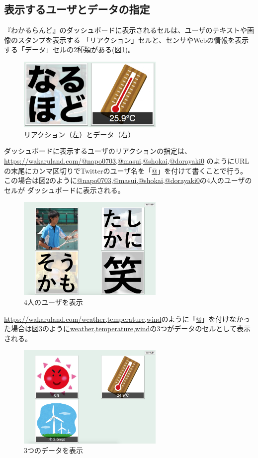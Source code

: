 \subsection{表示するユーザとデータの指定}
『わかるらんど』のダッシュボードに表示されるセルは、ユーザのテキストや画像のスタンプを表示する
「リアクション」セルと、センサやWebの情報を表示する「データ」セルの2種類がある(図\ref{cell})。

\begin{figure}[h]
\centering
\includegraphics[width=7cm]{images/cell.png}
\caption{リアクション（左）とデータ（右）}
\label{cell}
\end{figure}

ダッシュボードに表示するユーザのリアクションの指定は、
\url{https://wakaruland.com/@napo0703,@masui,@shokai,@dorayaki0}
のようにURLの末尾にカンマ区切りでTwitterのユーザ名を「\url{@}」を付けて書くことで行う。
この場合は図\ref{n_m_s_d}のように\url{@napo0703,@masui,@shokai,@dorayaki0}の4人のユーザのセルが
ダッシュボードに表示される。

\begin{figure}[h]
\centering
\includegraphics[width=7cm]{images/n_m_s_d.png}
\caption{4人のユーザを表示}
\label{n_m_s_d}
\end{figure}

\url{https://wakaruland.com/weather,temperature,wind}のように「\url{@}」を付けなかった場合は図\ref{w_t_w}のように\url{weather,temperature,wind}の3つがデータのセルとして表示される。

\begin{figure}[h]
\centering
\includegraphics[width=7cm]{images/w_t_w.png}
\caption{3つのデータを表示}
\label{w_t_w}
\end{figure}

